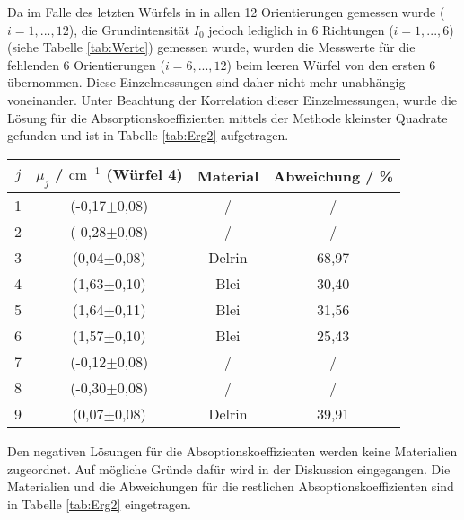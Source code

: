 Da im Falle des letzten Würfels in in allen 12 Orientierungen gemessen wurde ($i=1,...,12$),
die Grundintensität $I_0$ jedoch lediglich in 6 Richtungen ($i=1,...,6$) (siehe Tabelle \ref{tab:Werte}) gemessen wurde,
wurden die Messwerte für die fehlenden 6 Orientierungen ($i=6,...,12$) beim leeren Würfel von den ersten 6 übernommen.
Diese Einzelmessungen sind daher nicht mehr unabhängig voneinander.
Unter Beachtung der Korrelation dieser Einzelmessungen, wurde die Lösung für die Absorptionskoeffizienten
mittels der Methode kleinster Quadrate gefunden und ist in Tabelle \ref{tab:Erg2} aufgetragen.
\newpage
\begin{center}
    \label{tab:Erg2}
    \begin{tabular}{c c c c}
        \toprule
        $j$ & $\mu_j$ / $\text{cm}^{-1}$ (Würfel 4) & Material & Abweichung / \% \\
        \midrule
        1 & (-0,17$\pm$0,08) & / & / \\
        2 & (-0,28$\pm$0,08) & / & / \\
        3 & (0,04$\pm$0,08)  & Delrin & 68,97 \\
        4 & (1,63$\pm$0,10)  & Blei & 30,40 \\
        5 & (1,64$\pm$0,11)  & Blei & 31,56 \\
        6 & (1,57$\pm$0,10)  & Blei & 25,43 \\
        7 & (-0,12$\pm$0,08) & / & / \\
        8 & (-0,30$\pm$0,08) & / & / \\
        9 & (0,07$\pm$0,08)  & Delrin & 39,91 \\
        \bottomrule
    \end{tabular}
\end{center}
Den negativen Lösungen für die Absoptionskoeffizienten werden keine Materialien zugeordnet.
Auf mögliche Gründe dafür wird in der Diskussion eingegangen.
Die Materialien und die Abweichungen für die restlichen Absoptionskoeffizienten sind in Tabelle \ref{tab:Erg2} eingetragen.